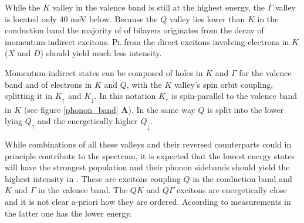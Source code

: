 While the $K$ valley in the valence band is still at the highest energy, the $\Gamma$ valley is located only 40 meV below\cite{wilson_determination_2017}. Because the $Q$ valley lies lower than $K$ in the conduction band the majority of \pl of \wse bilayers originates from the decay of momentum-indirect excitons. \textsc{Pl} from the direct excitons involving electrons in $K$ ($X$ and $D$) should yield much less intensity.

Momentum-indirect states can be composed of holes in $K$ and $\Gamma$ for the valence band and of electrons in $K$ and $Q$, with the $K$ valley's spin orbit coupling, splitting it in $K_\uparrow$ and $K_\downarrow$. In this notation $K_\uparrow$ is spin-parallel to the valence band in $K$ (see figure \ref{phonon_band} \textbf{A}). In the same way $Q$ is split into the lower lying $Q_\uparrow$ and the energetically higher $Q_\downarrow$.

While combinations of all these valleys and their reversed counterparts could in principle contribute to the \pl spectrum, it is expected that the lowest energy states will have the strongest population and their phonon sidebands should yield the highest intensity in \pl\!. These are excitons coupling $Q$ in the conduction band and $K$ and $\Gamma$ in the valence band. The $QK$ and $Q\Gamma$ excitons are energetically close and it is not clear a-priori how they are ordered. According to measurements in \cite{lindlau_role_2017} the latter one has the lower energy. 